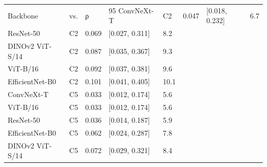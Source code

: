 \begin{tabular}{lllll}
\toprule
Backbone & vs. & ρ & 95%
\midrule
ConvNeXt-T & C2 & 0.047 & [0.018, 0.232] & 6.7 \\
ResNet-50 & C2 & 0.069 & [0.027, 0.311] & 8.2 \\
DINOv2 ViT-S/14 & C2 & 0.087 & [0.035, 0.367] & 9.3 \\
ViT-B/16 & C2 & 0.092 & [0.037, 0.381] & 9.6 \\
EfficientNet-B0 & C2 & 0.101 & [0.041, 0.405] & 10.1 \\
ConvNeXt-T & C5 & 0.033 & [0.012, 0.174] & 5.6 \\
ViT-B/16 & C5 & 0.033 & [0.012, 0.174] & 5.6 \\
ResNet-50 & C5 & 0.036 & [0.014, 0.187] & 5.9 \\
EfficientNet-B0 & C5 & 0.062 & [0.024, 0.287] & 7.8 \\
DINOv2 ViT-S/14 & C5 & 0.072 & [0.029, 0.321] & 8.4 \\
\bottomrule
\end{tabular}
